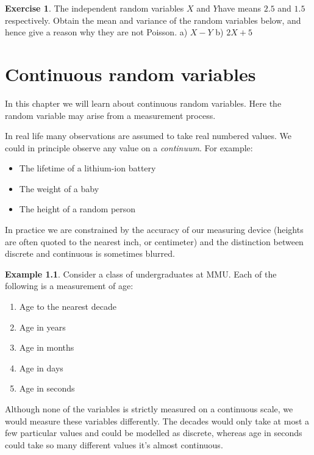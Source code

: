 \documentclass[
]{book}
\theoremstyle{definition}
\theoremstyle{definition}
\newtheorem{example}{Example}[chapter]
\theoremstyle{definition}
\newtheorem{exercise}{Exercise}[chapter]
\theoremstyle{definition}
\theoremstyle{remark}
\begin{document}
\begin{exercise}
The independent random variables \(X\) and \(Y\)have means \(2.5\) and \(1.5\) respectively. Obtain the mean and variance of the random variables below, and hence give a reason why they are not Poisson.
a) \(X-Y\)
b) \(2X+5\)
\end{exercise}

\hypertarget{cont}{%
\chapter{Continuous random variables}\label{cont}}

In this chapter we will learn about continuous random variables. Here the random variable may arise from a measurement process.

In real life many observations are assumed to take real numbered values. We could in principle observe any value on a \emph{continuum}. For example:

\begin{itemize}
\item
  The lifetime of a lithium-ion battery
\item
  The weight of a baby
\item
  The height of a random person
\end{itemize}

In practice we are constrained by the accuracy of our measuring device (heights are often quoted to the nearest inch, or centimeter) and the distinction between discrete and continuous is sometimes blurred.

\begin{example}

Consider a class of undergraduates at MMU. Each of the following is a measurement of age:

\begin{enumerate}
\def\labelenumi{\alph{enumi}.}
\item
  Age to the nearest decade
\item
  Age in years
\item
  Age in months
\item
  Age in days
\item
  Age in seconds
\end{enumerate}

\end{example}

Although none of the variables is strictly measured on a continuous scale, we would measure these variables differently. The decades would only take at most a few particular values and could be modelled as discrete, whereas age in seconds could take so many different values it's almost continuous.
\end{document}

